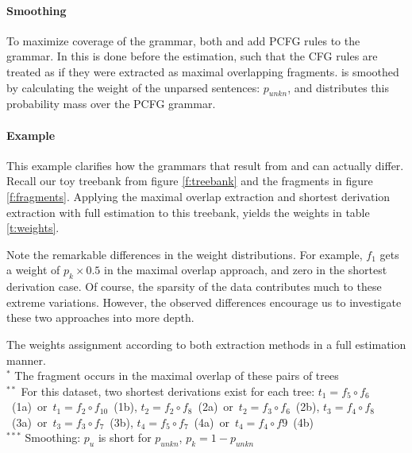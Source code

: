 \paragraph{Smoothing}
To maximize coverage of the grammar, both \ddop{} and \dops{} add PCFG rules to the grammar. In \ddop{} this is done before the estimation, such that the CFG rules are treated as if they were extracted as maximal overlapping fragments. \dops{} is smoothed by calculating the weight of the unparsed sentences: $p_{unkn}$, and distributes this probability mass over the PCFG grammar.




\paragraph{Example}
\FloatBarrier
This example clarifies how the grammars that result from \ddop{} and \dops{} can actually differ. Recall our toy treebank from figure \ref{f:treebank} and the fragments in figure \ref{f:fragments}. 
Applying the maximal overlap extraction and shortest derivation extraction with full estimation to this treebank, yields the weights in table \ref{t:weights}.

Note the remarkable differences in the weight distributions. For example, $f_1$ gets a weight of $p_k\times 0.5$ in the maximal overlap approach, and zero in the shortest derivation case. Of course, the sparsity of the data contributes much to these extreme variations. However, the observed differences encourage us to investigate these two approaches into more depth.


\begin{table*}[t]
\center

\caption{The weights assignment according to both extraction methods in a full estimation manner.\\
{\footnotesize$^*$ The fragment occurs in the maximal overlap of these pairs of trees\\
$^{**}$ For this dataset, two shortest derivations exist for each tree:
$t_1=f_5\circ f_6$~(1a)~or~$t_1=f_2\circ f_{10}$~(1b), 	$t_2=f_2\circ f_8$~(2a)~or~$t_2=f_3\circ f_6$~(2b),
$t_3=f_4\circ f_8$~(3a)~or~$t_3=f_3\circ f_7$~(3b),	$t_4=f_5\circ f_7$~(4a)~or~$t_4=f_4\circ f9$~(4b)\\
$^{***}$ Smoothing: $p_u$ is short for $p_{unkn}$, $p_k = 1- p_{unkn}$
}
}
\label{t:weights}
\end{table*}




